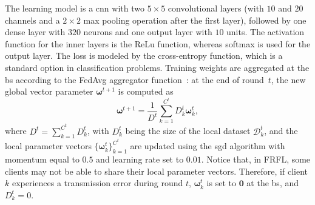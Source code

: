 \documentclass[10pt, conference, letterpaper]{IEEEtran}
\begin{document}
	
	The learning model is a \gls{cnn} with two $5 \times 5$ convolutional layers (with $10$ and $20$ channels and a $2 \times 2$ max pooling operation after the first layer), followed by one dense layer with $320$ neurons and one output layer with $10$ units. 
	The activation function for the inner layers is the ReLu function, whereas softmax is used for the output layer. The loss is modeled by the cross-entropy function, which is a standard option in classification problems.
	Training weights are aggregated at the \gls{bs} according to the {FedAvg} aggregator function~\cite{BrendanMcMahan2017}: at the end of round~$t$, the new global vector parameter $\bm{\omega}^{t+1}$ is computed as 
	\begin{equation}
		\bm{\omega}^{t+1} = \frac{1}{D^t} \sum_{k=1}^{C^t} D_k^t \bm{\omega}_k^t,	
	\end{equation}
	where $D^t = \sum_{k=1}^{C^t} D_k^t$, with $D_k^t$ being the size of the local dataset $\mathcal{D}_k^t$, and the local parameter vectors $\{ \bm{\omega}_k^t\}_{k=1}^{C^t}$ are updated using the \gls{sgd} algorithm with momentum equal to $0.5$ and learning rate set to $0.01$. 
	Notice that, in FRFL, some clients may not be able to share their local parameter vectors. Therefore, if client $k$ experiences a transmission error during round $t$, $ \bm{\omega}_k^t$ is set to $\bm{0}$ at the \gls{bs}, and $D_k^t=0$.
	
	
	
	
\end{document}

